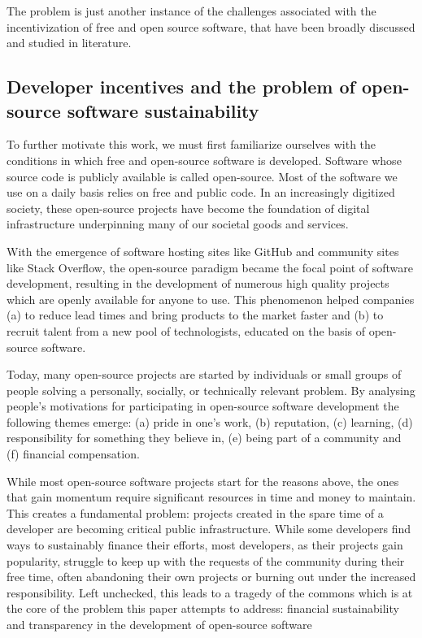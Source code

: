 The problem is just another instance of the challenges associated with the
incentivization of free and open source software, that have been broadly
discussed and studied in literature.

\subsection{Developer incentives and the problem of open-source software
sustainability}

To further motivate this work, we must first familiarize ourselves with the
conditions in which free and open-source software is developed. Software whose
source code is publicly available is called open-source. Most of the software
we use on a daily basis relies on free and public code. In an increasingly
digitized society, these open-source projects have become the foundation of
digital infrastructure underpinning many of our societal goods and services.

With the emergence of software hosting sites like GitHub and community sites
like Stack Overflow, the open-source paradigm became the focal point of
software development, resulting in the development of numerous high quality
projects which are openly available for anyone to use. This phenomenon helped
companies (a) to reduce lead times and bring products to the market faster and
(b) to recruit talent from a new pool of technologists, educated on the basis
of open-source software.

Today, many open-source projects are started by individuals or small groups of
people solving a personally, socially, or technically relevant problem. By
analysing people's motivations for participating in open-source software
development the following themes emerge: (a) pride in one's work, (b)
reputation, (c) learning, (d) responsibility for something they believe in, (e)
being part of a community and (f) financial compensation.

While most open-source software projects start for the reasons above, the ones
that gain momentum require significant resources in time and money to maintain.
This creates a fundamental problem: projects created in the spare time of a
developer are becoming critical public infrastructure. While some developers
find ways to sustainably finance their efforts, most developers, as their
projects gain popularity, struggle to keep up
with the requests of the community during their free time, often abandoning
their own projects or burning out under the increased responsibility. Left
unchecked, this leads to a tragedy of the commons which is at the core of the
problem this paper attempts to address: financial sustainability and
transparency in the development of open-source software

